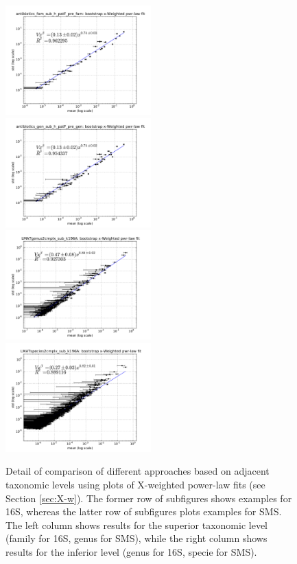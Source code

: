 \documentclass[12pt,oneside,letterpaper]{article}
\begin{document}
\begin{figure} 
  \includegraphics[width=0.5\textwidth]{results/taxalevel/xWb_fam_16S.pdf}
  \includegraphics[width=0.5\textwidth]{results/taxalevel/xWb_gen_16S.pdf}
  \includegraphics[width=0.5\textwidth]{results/taxalevel/xWb_gen_SMS.pdf}
  \includegraphics[width=0.5\textwidth]{results/taxalevel/xWb_spc_SMS.pdf}
\caption{Detail of comparison of different approaches based on adjacent taxonomic levels using plots of X-weighted power-law fits (see Section \ref{sec:X-w}). The former row of subfigures shows examples for 16S, whereas the latter row of subfigures plots examples for SMS. The left column shows results for the superior taxonomic level (family for 16S, genus for SMS), while the right column shows results for the inferior level (genus for 16S, specie for SMS).}
\label{fig:taxlev2}
\end{figure}
\end{document}
